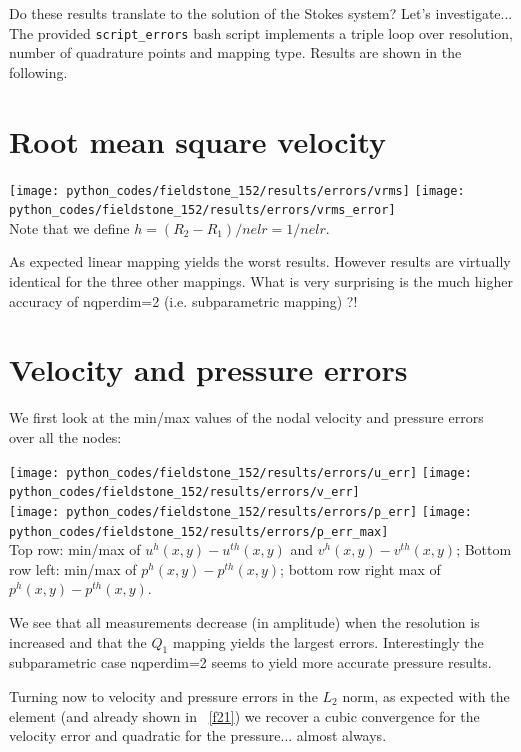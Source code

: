 Do these results translate to the solution of the Stokes system? Let's investigate...
The provided {\tt script\_errors} bash script implements a triple loop 
over resolution, number of quadrature points and mapping type.
Results are shown in the following.

\newpage
\section*{Root mean square velocity}

\begin{center}
\texttt{[image: python\_codes/fieldstone\_152/results/errors/vrms]}
\texttt{[image: python\_codes/fieldstone\_152/results/errors/vrms\_error]}\\
{\captionfont Note that we define $h=(R_2-R_1)/nelr=1/nelr$.}
\end{center}

As expected linear mapping yields the worst results. However results are virtually identical for 
the three other mappings.
What is very surprising is the much higher accuracy of {\python nqperdim=2} (i.e. subparametric mapping) ?!


\section*{Velocity and pressure errors}

We first look at the min/max values of the nodal velocity and pressure errors over all the nodes:
\begin{center}
\texttt{[image: python\_codes/fieldstone\_152/results/errors/u\_err]}
\texttt{[image: python\_codes/fieldstone\_152/results/errors/v\_err]}\\
\texttt{[image: python\_codes/fieldstone\_152/results/errors/p\_err]}
\texttt{[image: python\_codes/fieldstone\_152/results/errors/p\_err\_max]}\\
{\captionfont Top row: min/max of $u^h(x,y)-u^{th}(x,y)$ and $v^h(x,y)-v^{th}(x,y)$;
Bottom row left: min/max of $p^h(x,y)-p^{th}(x,y)$; bottom row right max of  $p^h(x,y)-p^{th}(x,y)$.} 
\end{center}
We see that all measurements decrease (in amplitude) when the resolution is increased and that 
the $Q_1$ mapping yields the largest errors. 
Interestingly the subparametric case {\python nqperdim=2} seems to yield more accurate 
pressure results.

Turning now to velocity and pressure errors in the $L_2$ norm, 
as expected with the \QtwoQone element (and already shown in \stone~\ref{f21})
we recover a cubic convergence for the velocity error and quadratic for the 
pressure... almost always.

